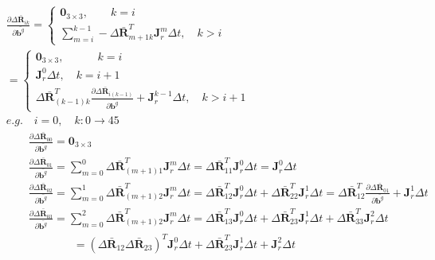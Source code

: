 \documentclass{article}
\begin{document}
\begin{CJK*}{GBK}{song}
\begin{equation}\left.\begin{aligned}&
\frac{\partial{\Delta \bar{\mathbf{R}}_{ik}}}{\partial{\bar{\mathbf{b}^g}}} =
\left\{
\begin{aligned}
\mathbf{0}_{3\times{3}},\qquad k=i
\\
\sum_{m=i}^{k-1}-\Delta \bar{\mathbf{R}}_{m+1k}^{T}\mathbf{J}^{m}_r\Delta{t},\quad k>i
\end{aligned}
\right.
\\&
=
\left\{
\begin{aligned}
\mathbf{0}_{3\times{3}},\qquad \quad k=i
\\
\mathbf{J}^{0}_r\Delta{t},\quad k=i+1
\\
\Delta \bar{\mathbf{R}}_{(k-1)k}^{T}\frac{\partial{\Delta \bar{\mathbf{R}}_{i(k-1)}}}{\partial{\bar{\mathbf{b}^g}}}+\mathbf{J}^{k-1}_r\Delta{t}
,\quad k>i+1
\end{aligned}
\right.
\\&
e.g. \quad i=0, \quad k:0\rightarrow{45}
\\&
\qquad \frac{\partial{\Delta \bar{\mathbf{R}}_{00}}}{\partial{\bar{\mathbf{b}^g}}} = \mathbf{0}_{3\times{3}}
\\&
\qquad \frac{\partial{\Delta \bar{\mathbf{R}}_{01}}}{\partial{\bar{\mathbf{b}^g}}} = \sum_{m=0}^{0}\Delta \bar{\mathbf{R}}_{(m+1)1}^{T}\mathbf{J}^{m}_r\Delta{t}
=\Delta \bar{\mathbf{R}}_{11}^{T}\mathbf{J}^{0}_r\Delta{t}=\mathbf{J}^{0}_r\Delta{t}
\\&
\qquad \frac{\partial{\Delta \bar{\mathbf{R}}_{02}}}{\partial{\bar{\mathbf{b}^g}}} = \sum_{m=0}^{1}\Delta \bar{\mathbf{R}}_{(m+1)2}^{T}\mathbf{J}^{m}_r\Delta{t}
=\Delta \bar{\mathbf{R}}_{12}^{T}\mathbf{J}^{0}_r\Delta{t}
+ \Delta \bar{\mathbf{R}}_{22}^{T}\mathbf{J}^{1}_r\Delta{t}
=\Delta \bar{\mathbf{R}}_{12}^{T}\frac{\partial{\Delta \bar{\mathbf{R}}_{01}}}{\partial{\bar{\mathbf{b}^g}}}+\mathbf{J}^{1}_r\Delta{t}
\\&
\qquad \frac{\partial{\Delta \bar{\mathbf{R}}_{03}}}{\partial{\bar{\mathbf{b}^g}}} = \sum_{m=0}^{2}\Delta \bar{\mathbf{R}}_{(m+1)2}^{T}\mathbf{J}^{m}_r\Delta{t}
=\Delta \bar{\mathbf{R}}_{13}^{T}\mathbf{J}^{0}_r\Delta{t}
+ \Delta \bar{\mathbf{R}}_{23}^{T}\mathbf{J}^{1}_r\Delta{t}
+ \Delta \bar{\mathbf{R}}_{33}^{T}\mathbf{J}^{2}_r\Delta{t}
\\&
\qquad \qquad \qquad =
{(\Delta\bar{\mathbf{R}}_{12}\Delta\bar{\mathbf{R}}_{23})}^{T}\mathbf{J}^{0}_r\Delta{t}
+\Delta \bar{\mathbf{R}}_{23}^{T}\mathbf{J}^{1}_r\Delta{t}+
\mathbf{J}^{2}_r\Delta{t}
\\&

\end{aligned}
\end{equation}
\end{CJK*}
\end{document}
